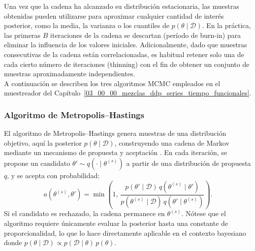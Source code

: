 Una vez que la cadena ha alcanzado su distribución estacionaria, las muestras obtenidas pueden utilizarse para aproximar cualquier cantidad de interés posterior, como la media, la varianza o los cuantiles de $p(\theta \mid \mathcal{D})$. En la práctica, las primeras $B$ iteraciones de la cadena se descartan (período de burn-in) para eliminar la influencia de los valores iniciales. Adicionalmente, dado que muestras consecutivas de la cadena están correlacionadas, es habitual retener solo una de cada cierto número de iteraciones (thinning) con el fin de obtener un conjunto de muestras aproximadamente independientes.\\

A continuación se describen los tres algoritmos MCMC empleados en el muestreador del Capítulo~\ref{03_00_00_mezclas_ddp_series_tiempo_funcionales}.

\subsubsection{Algoritmo de Metropolis--Hastings}
\label{02_03_02_01_metropolis_hastings}
El algoritmo de Metropolis--Hastings genera muestras de una distribución objetivo, aquí la posterior $p(\theta \mid \mathcal{D})$, construyendo una cadena de Markov mediante un mecanismo de propuesta y aceptación \citep{02_07_rizzo2007statistical}. En cada iteración, se propone un candidato $\theta' \sim q(\cdot \mid \theta^{(s)})$ a partir de una distribución de propuesta $q$, y se acepta con probabilidad:
\begin{equation}
    a(\theta^{(s)}, \theta') = \min\!\left(1,\,
    \frac{p(\theta' \mid \mathcal{D})\, q(\theta^{(s)} \mid \theta')}
         {p(\theta^{(s)} \mid \mathcal{D})\, q(\theta' \mid \theta^{(s)})}\right).
\end{equation}
Si el candidato es rechazado, la cadena permanece en $\theta^{(s)}$. Nótese que el algoritmo requiere únicamente evaluar la posterior hasta una constante de proporcionalidad, lo que lo hace directamente aplicable en el contexto bayesiano donde $p(\theta \mid \mathcal{D}) \propto p(\mathcal{D} \mid \theta)\, p(\theta)$.

